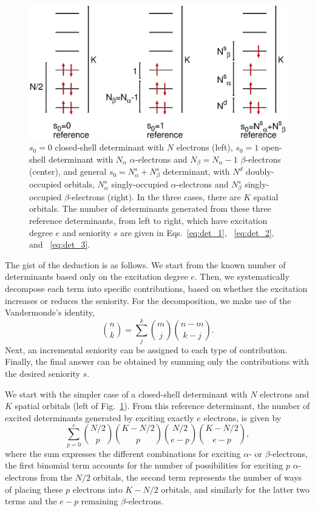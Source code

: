\documentclass[aip,jcp,reprint,noshowkeys,superscriptaddress]{revtex4-1}
\newcommand{\Na}{N_{\alpha}}
\newcommand{\Nb}{N_{\beta}}
\newcommand{\Nd}{N^{d}}
\newcommand{\Nas}{N^s_{\alpha}}
\newcommand{\Nbs}{N^s_{\beta}}
\begin{document}
\begin{figure}[h!]
\includegraphics[width=1.0\linewidth]{determinants_appendix}
\caption{
$s_0=0$ closed-shell determinant with $N$ electrons (left),
$s_0=1$ open-shell determinant with $\Na$ $\alpha$-electrons and $\Nb=\Na-1$ $\beta$-electrons (center),
and general $s_0=\Nas+\Nbs$ determinant, with $\Nd$ doubly-occupied orbitals, $\Nas$ singly-occupied $\alpha$-electrons and $\Nbs$ singly-occupied $\beta$-electrons (right).
In the three cases, there are $K$ spatial orbitals.
The number of determinants generated from these three reference determinants, from left to right, which have excitation degree $e$ and seniority $s$
are given in Eqs.~\eqref{eq:det_1}, ~\eqref{eq:det_2}, and ~\eqref{eq:det_3}.
}
\label{fig:appendix}
\end{figure}

The gist of the deduction is as follows.
We start from the known number of determinants based only on the excitation degree $e$.
Then, we systematically decompose each term into specific contributions,
based on whether the excitation increases or reduces the seniority.
For the decomposition, we make use of the Vandermonde's identity,
\begin{equation}
	\binom{n}{k} = \sum_{j}^{k} \binom{m}{j} \binom{n-m}{k-j}.
\end{equation}
Next, an incremental seniority can be assigned to each type of contribution.
Finally, the final answer can be obtained by summing only the contributions with the desired seniority $s$.

We start with the simpler case of a closed-shell determinant with $N$ electrons and $K$ spatial orbitals (left of Fig.~\ref{fig:appendix}).
From this reference determinant, the number of excited determinants generated by exciting exactly $e$ electrons, is given by \cite{SzaboBook}
\begin{equation}
\sum_{p=0}^{e} \binom{N/2}{p} \binom{K-N/2}{p} \binom{N/2}{e-p} \binom{K-N/2}{e-p},
\label{eq:e_closed}
\end{equation}
where the sum expresses the different combinations for exciting $\alpha$- or $\beta$-electrons,
the first binomial term accounts for the number of possibilities for exciting $p$ $\alpha$-electrons from the $N/2$ orbitals,
the second term represents the number of ways of placing these $p$ electrons into $K-N/2$ orbitals,
and similarly for the latter two terms and the $e-p$ remaining $\beta$-electrons.
\end{document}
